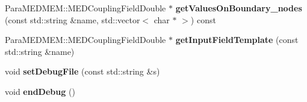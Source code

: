 \begin{DoxyCompactItemize}
\item 
\hypertarget{class_l_i_b_m_e_s_h_a4eebed17ef5c78efce759b42a527aca9}{Para\-M\-E\-D\-M\-E\-M\-::\-M\-E\-D\-Coupling\-Field\-Double $\ast$ {\bfseries get\-Values\-On\-Boundary\-\_\-nodes} (const std\-::string \&name, std\-::vector$<$ char $\ast$ $>$) const }\label{class_l_i_b_m_e_s_h_a4eebed17ef5c78efce759b42a527aca9}

\item 
\hypertarget{class_l_i_b_m_e_s_h_a8608739ac966d63fd803cd77ae4e1a1f}{Para\-M\-E\-D\-M\-E\-M\-::\-M\-E\-D\-Coupling\-Field\-Double $\ast$ {\bfseries get\-Input\-Field\-Template} (const std\-::string \&name)}\label{class_l_i_b_m_e_s_h_a8608739ac966d63fd803cd77ae4e1a1f}

\item 
\hypertarget{class_l_i_b_m_e_s_h_addbb8f89d4a02d0e23cde7965a65158b}{void {\bfseries set\-Debug\-File} (const std\-::string \&s)}\label{class_l_i_b_m_e_s_h_addbb8f89d4a02d0e23cde7965a65158b}

\item 
\hypertarget{class_l_i_b_m_e_s_h_ad33629ec2a02e86d8a9b0ad2cd2f3bd3}{void {\bfseries end\-Debug} ()}\label{class_l_i_b_m_e_s_h_ad33629ec2a02e86d8a9b0ad2cd2f3bd3}

\end{DoxyCompactItemize}
